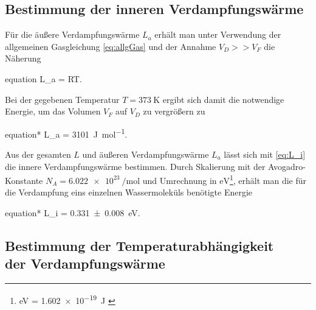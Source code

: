 	\subsection{Bestimmung der inneren Verdampfungswärme}
	Für die äußere Verdampfungswärme $L_{a}$ erhält man unter Verwendung der allgemeinen
	Gasgleichung \eqref{eq:allgGas} und der Annahme $V_{D} >> V_{F}$ die Näherung
	\begin{empheq}{equation}
	 	\label{eq:L_a}
	 	L_{a} = RT.
	\end{empheq}
	Bei der gegebenen Temperatur $T = \SI{373}{\kelvin}$ ergibt sich damit die notwendige 
	Energie, um das Volumen $V_{F}$ auf $V_{D}$ zu vergrößern zu
	\begin{empheq}{equation*}
		 	L_{a} =  \SI{3101}{\joule\per\mole}\;.
    \end{empheq}  
	Aus der gesamten $L$ und  äußeren Verdampfungswärme $L_{a}$ lässt sich mit \eqref{eq:L_i}
	die innere Verdampfungswärme bestimmen. Durch Skalierung mit der Avogadro-Konstante 
	$N_{A} = \SI{6.022e23}{\per\mole}$ \cite{SciPy} und Umrechnung in $\si{\eV}$\footnote{\si{\eV} = \SI{1.602e-19}{\joule} \cite{SciPy}},
	erhält man die für die Verdampfung eins einzelnen Wassermoleküls benötigte Energie
	\begin{empheq}{equation*}
			 	L_{i} =  \SI{0.331(8)}{\eV}\;.
	\end{empheq} 
	
	
\subsection{Bestimmung der Temperaturabhängigkeit\\ der Verdampfungswärme}